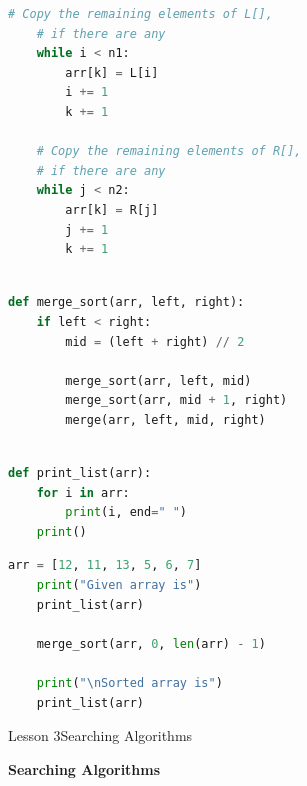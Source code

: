 \documentclass[aspectratio=1610]{beamer}
\begin{document}
\begin{frame}[fragile]
\begin{lstlisting}[language=Python]
   # Copy the remaining elements of L[],
    # if there are any
    while i < n1:
        arr[k] = L[i]
        i += 1
        k += 1

    # Copy the remaining elements of R[], 
    # if there are any
    while j < n2:
        arr[k] = R[j]
        j += 1
        k += 1

\end{lstlisting}
\end{frame}


\begin{frame}[fragile]
\begin{lstlisting}[language=Python]

def merge_sort(arr, left, right):
    if left < right:
        mid = (left + right) // 2

        merge_sort(arr, left, mid)
        merge_sort(arr, mid + 1, right)
        merge(arr, left, mid, right)

\end{lstlisting}
\end{frame}



\begin{frame}[fragile]
\begin{lstlisting}[language=Python]

def print_list(arr):
    for i in arr:
        print(i, end=" ")
    print()
\end{lstlisting}
\end{frame}


\begin{frame}[fragile]
\begin{lstlisting}[language=Python]
    arr = [12, 11, 13, 5, 6, 7]
    print("Given array is")
    print_list(arr)

    merge_sort(arr, 0, len(arr) - 1)

    print("\nSorted array is")
    print_list(arr)    
\end{lstlisting}
\end{frame}





\begin{frame}{Lesson 3}{Searching Algorithms}
\begin{center}
\Huge \textbf{Searching Algorithms}
\end{center}
\end{frame}
\end{document}
